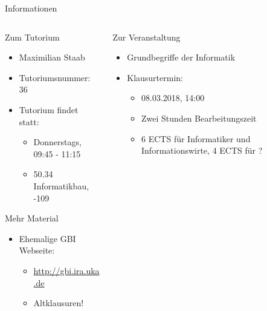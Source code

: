 
{

\begin{frame}{Informationen}
	
	\begin{columns}
		\begin{column}{0.5\textwidth}
			
			\begin{block}{Zum Tutorium}
				\begin{itemize}
					\item Maximilian Staab
					\item Tutoriumsnummer: 36
					\item Tutorium findet statt:
					\begin{itemize}
						\item Donnerstags, 09:45 - 11:15
						\item 50.34 Informatikbau, -109
					\end{itemize}
				\end{itemize}
			\end{block}
			
			\begin{block}{Mehr Material}
				\begin{itemize}
					\item Ehemalige GBI Webseite:
					\begin{itemize}
						\item \url{http://gbi.ira.uka.de}
						\item Altklausuren!
					\end{itemize}
				\end{itemize}
			\end{block}
			
		\end{column}
		\begin{column}{0.5\textwidth}
			
			\begin{block}{Zur Veranstaltung}
				\begin{itemize}
					\item Grundbegriffe der Informatik
					\item Klausurtermin:
					\begin{itemize}
						\item 08.03.2018, 14:00
						\item Zwei Stunden Bearbeitungszeit
						\item 6 ECTS für Informatiker und Informationswirte, 4 ECTS für ?
					\end{itemize}
				\end{itemize}
			\end{block}
			

\end{column}
\end{columns}
\end{frame}}
